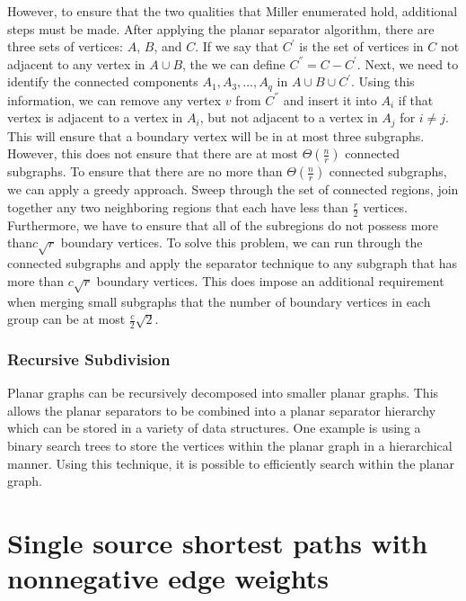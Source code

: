 \documentclass[12pt]{article}
\begin{document}
    However, to ensure that the two qualities that Miller enumerated hold, additional steps must be made. After applying the planar separator algorithm, there are three sets of vertices: $A$, $B$, and $C$. If we say that $C^{'}$ is the set of vertices in $C$ not adjacent to any vertex in $A \cup B$, the we can define $C^{''} = C - C^{'}$. Next, we need to identify the connected components $A_1, A_3, \ldots, A_q$ in $A \cup B \cup C^{'}$. Using this information, we can remove any vertex $v$ from $C^{''}$ and insert it into $A_i$ if that vertex is adjacent to a vertex in $A_i$, but not adjacent to a vertex in $A_j$ for $i \neq j$. This will ensure that a boundary vertex will be in at most three subgraphs. However, this does not ensure that there are at most $\Theta \left ( \frac{n}{r} \right )$ connected subgraphs. To ensure that there are no more than $\Theta \left ( \frac{n}{r} \right )$ connected subgraphs, we can apply a greedy approach. Sweep through the set of connected regions, join together any two neighboring regions that each have less than $\frac{r}{2}$ vertices. Furthermore, we have to ensure that all of the subregions do not possess more than$c \sqrt{r}$ boundary vertices. To solve this problem, we can run through the connected subgraphs and apply the separator technique to any subgraph that has more than $c \sqrt{r}$ boundary vertices. This does impose an additional requirement when merging small subgraphs that the number of boundary vertices in each group can be at most $\frac{c}{2} \sqrt{2}$.

    \subsubsection{Recursive Subdivision}
    \label{sec:graph-sep-rsub-recursive}


    Planar graphs can be recursively decomposed into smaller planar graphs. This allows the planar separators to be combined into a planar separator hierarchy which can be stored in a variety of data structures. One example is using a binary search trees to store the vertices within the planar graph in a hierarchical manner. Using this technique, it is possible to efficiently search within the planar graph.

\section{Single source shortest paths with nonnegative edge weights}
\label{sec:nonn-edge-weights}
\end{document}
